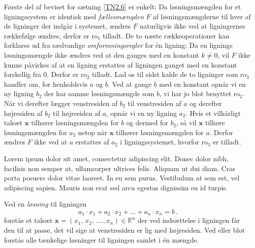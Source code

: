 \begin{bevis}

Første del af beviset for sætning \ref{TN2.6} er enkelt: Da løsningsmængden for et ligningssystem er identisk med \emph{fællesmængden} $F$ af løsningsmængderne til hver af de ligninger der indgår i systemet, ændres $F$ naturligvis ikke ved at ligningernes rækkefølge ændres, derfor er ro$_1$ tilladt.\bs
De to næste rækkeoperationer kan forklares ud fra sædvanlige \textit{omformningsregler} for én ligning:\bs
Da en lignings løsningsmængde ikke ændres ved at den ganges med en konstant $k\neq 0$, vil $F$ ikke kunne påvirkes af at en ligning erstattes af ligningen ganget med en konstant forskellig fra 0. Derfor er ro$_2$ tilladt.\bs
Lad os til sidst kalde de to ligninger som ro$_3$ handler om, for henholdsvis $a$ og $b$. Ved at gange $b$ med en konstant opnår vi en ny ligning $b_2$ der har samme løsningsmængde som $b$, vi har jo blot benyttet ro$_2$. Når vi derefter lægger venstresiden af $b_2$ til venstresiden af $a$ og derefter højresiden af $b_2$ til højresiden af $a$, opnår vi en ny ligning $a_2$. Hvis et vilkårligt talsæt $\mathbf x$ tilhører løsningsmængden for $b$ og dermed for $b_2$, så vil $\mathbf x$ tilhøre løsningsmængden for $a_2$ netop når $\mathbf x$ tilhører løsningsmængden for $a$. Derfor ændres $F$ ikke ved at $a$ erstattes af $a_2$ i ligningssystemet, hvorfor ro$_3$ er tilladt.
\end{bevis}



Lorem ipsum dolor sit amet, consectetur adipiscing elit. Donec dolor nibh, facilisis non semper at, ullamcorper ultrices felis. Aliquam ut dui diam. Cras porta posuere dolor vitae laoreet. In eu sem purus. Vestibulum at sem est, vel adipiscing sapien. Mauris non erat sed arcu egestas dignissim eu id turpis. 


\begin{definition}
Ved en \textit{løsning} til ligningen 
\begin{equation}\label{TN999.1b}
a_1\cdot x_1+a_2\cdot x_2+...+a_n\cdot x_n=b\,.
\end{equation}
forstås et talsæt $\mathbf{x}=(x_1,\,x_2,\,...\,,x_n) \in \mathbb R^n$ der ved indsættelse i ligningen får den til at passe, det vil sige at venstresiden er lig med højresiden. \bs
Ved  eller blot  forstås alle tænkelige løsninger til ligningen samlet i én mængde.
\end{definition}


